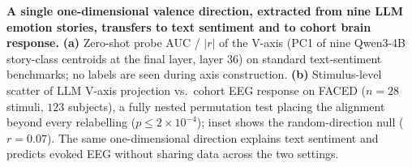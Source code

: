 \textbf{A single one-dimensional valence direction, extracted from
nine LLM emotion stories, transfers to text sentiment and to cohort
brain response.}
\textbf{(a)} Zero-shot probe AUC / $|r|$ of the V-axis (PC1 of nine
Qwen3-4B story-class centroids at the final layer, layer 36) on standard
text-sentiment benchmarks; no labels are seen during axis construction.
\textbf{(b)} Stimulus-level scatter of LLM V-axis projection vs.\
cohort EEG response on FACED ($n{=}28$ stimuli, $123$ subjects), a
fully nested permutation test placing the alignment beyond every
relabelling ($p{\le}2{\times}10^{-4}$); inset shows the
random-direction null ($r{=}0.07$). The same one-dimensional direction
explains text sentiment and predicts evoked EEG without sharing data
across the two settings.
